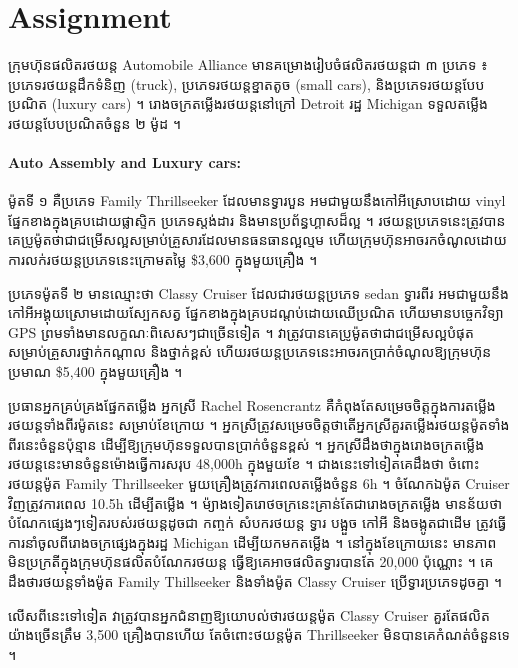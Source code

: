 \newpage
\section{Assignment}
ក្រុមហ៊ុនផលិតរថយន្ត Automobile Alliance មានគម្រោងរៀបចំផលិតរថយន្តជា ៣
ប្រភេទ ៖ ប្រភេទរថយន្តដឹកទំនិញ (truck), ប្រភេទរថយន្តខ្នាតតូច (small cars),
និងប្រភេទរថយន្តបែបប្រណិត (luxury cars) ។ រោងចក្រតម្លើងរថយន្តនៅក្រៅ Detroit
រដ្ឋ Michigan ទទួលតម្លើងរថយន្តបែបប្រណិតចំនួន ២ ម៉ូដ ។

\paragraph{Auto Assembly and Luxury cars:}
ម៉ូតទី ១ គឺប្រភេទ Family Thrillseeker ដែលមានទ្វារបួន អមជាមួយនឹងកៅអីស្រោបដោយ vinyl
ផ្នែកខាងក្នុងគ្របដោយផ្លាស្ទិក ប្រភេទស្តង់ដារ និងមានប្រព័ន្ធហ្គាសដ៏ល្អ ។
រថយន្តប្រភេទនេះត្រូវបានគេប្រូម៉ូតថាជាជម្រើសល្អសម្រាប់គ្រួសារដែលមានធនធានល្អល្មម
ហើយក្រុមហ៊ុនអាចរកចំណូលដោយការលក់រថយន្តប្រភេទនេះក្រោមតម្លៃ \$3,600 ក្នុងមួយគ្រឿង ។

ប្រភេទម៉ូតទី ២ មានឈ្មោះថា Classy Cruiser ដែលជារថយន្តប្រភេទ sedan ទ្វារពីរ
អមជាមួយនឹងកៅអីអង្គុយស្រោមដោយស្បែកសត្វ ផ្នែកខាងក្នុងគ្របដណ្តប់ដោយឈើប្រណិត
ហើយមានបច្ចេកវិទ្យា GPS ព្រមទាំងមានលក្ខណៈពិសេសៗជាច្រើនទៀត ។
វាត្រូវបានគេប្រូម៉ូតថាជាជម្រើសល្អបំផុតសម្រាប់គ្រួសារថ្នាក់កណ្តាល និងថ្នាក់ខ្ពស់
ហើយរថយន្តប្រភេទនេះអាចរកប្រាក់ចំណូលឱ្យក្រុមហ៊ុនប្រមាណ \$5,400 ក្នុងមួយគ្រឿង ។

ប្រធានអ្នកគ្រប់គ្រងផ្នែកតម្លើង អ្នកស្រី Rachel Rosencrantz គឺកំពុងតែសម្រេចចិត្តក្នុងការតម្លើងរថយន្តទាំងពីរម៉ូតនេះ
សម្រាប់ខែក្រោយ ។ អ្នកស្រីត្រូវសម្រេចចិត្តថាតើអ្នកស្រីគួរតម្លើងរថយន្តម៉ូតទាំងពីរនេះចំនួនប៉ុន្មាន
ដើម្បីឱ្យក្រុមហ៊ុនទទួលបានប្រាក់ចំនួនខ្ពស់ ។ អ្នកស្រីដឹងថាក្នុងរោងចក្រតម្លើងរថយន្តនេះមានចំនួនម៉ោងធ្វើការសរុប
48,000h ក្នុងមួយខែ ។ ជាងនេះទៅទៀតគេដឹងថា ចំពោះរថយន្តម៉ូត Family Thrillseeker
មួយគ្រឿងត្រូវការពេលតម្លើងចំនួន 6h ។ ចំណែកឯម៉ូត Cruiser វិញត្រូវការពេល 10.5h ដើម្បីតម្លើង ។
ម៉្យាងទៀតរោថចក្រនេះគ្រាន់តែជារោងចក្រតម្លើង មានន័យថាបំណែកផ្សេងៗទៀតរបស់រថយន្តដូចជា
កញ្ចក់ សំបករថយន្ត ទ្វារ បង្អួច កៅអី និងចង្កូតជាដើម
ត្រូវធ្វើការនាំចូលពីរោងចក្រផ្សេងក្នុងរដ្ឋ Michigan ដើម្បីយកមកតម្លើង ។ 
នៅក្នុងខែក្រោយនេះ មានភាពមិនប្រក្រតីក្នុងក្រុមហ៊ុនផលិតបំណែករថយន្ត ធ្វើឱ្យគេអាចផលិតទ្វារបានតែ
20,000 ប៉ុណ្ណោះ ។ គេដឹងថារថយន្តទាំងម៉ូត Family Thillseeker និងទាំងម៉ូត Classy Cruiser
ប្រើទ្វារប្រភេទដូចគ្នា ។

លើសពីនេះទៅទៀត វាត្រូវបានអ្នកជំនាញឱ្យយោបល់ថារថយន្តម៉ូត Classy Cruiser គួរតែផលិតយ៉ាងច្រើនត្រឹម
3,500 គ្រឿងបានហើយ តែចំពោះថយន្តម៉ូត Thrillseeker មិនបានគេកំណត់ចំនួនទេ ។

